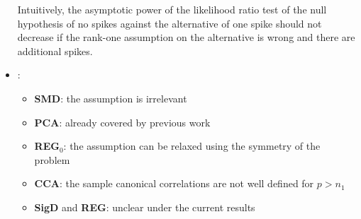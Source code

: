 \documentclass[twoside]{article}
\begin{document}
\begin{itemize}
    Intuitively, the asymptotic power of the likelihood ratio test of the null hypothesis of no spikes against the alternative of one spike should not decrease if the rank-one assumption on the alternative is wrong and there are additional spikes.
    \item {}: 
    \begin{itemize}
        \item \textbf{SMD}: the assumption is irrelevant
        \item \textbf{PCA}: already covered by previous work
        \item \textbf{REG}$_0$: the assumption can be relaxed using the symmetry of the problem
        \item \textbf{CCA}: the sample canonical correlations are not well defined for $p> n_1$
        \item \textbf{SigD} and \textbf{REG}: unclear under the current results
    \end{itemize}
\end{itemize}
\end{document}
